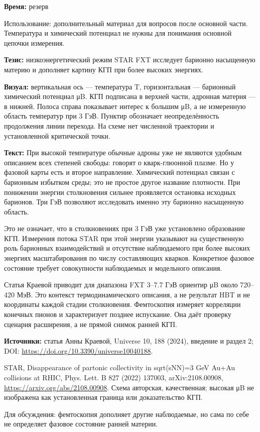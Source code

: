 \textbf{Время:} резерв

Использование: дополнительный материал для вопросов после основной части. Температура и химический потенциал не нужны для понимания основной цепочки измерения.

\textbf{Тезис:} низкоэнергетический режим STAR FXT исследует барионно насыщенную материю и дополняет картину КГП при более высоких энергиях.

\textbf{Визуал:} вертикальная ось — температура T, горизонтальная — барионный химический потенциал μB. КГП подписана в верхней части, адронная материя — в нижней. Полоса справа показывает интерес к большим μB, а не измеренную область температур при 3 ГэВ. Пунктир обозначает неопределённость продолжения линии перехода. На схеме нет численной траектории и установленной критической точки.

\textbf{Текст:} При высокой температуре обычные адроны уже не являются удобным описанием всех степеней свободы: говорят о кварк-глюонной плазме. Но у фазовой карты есть и второе направление. Химический потенциал связан с барионным избытком среды; это не простое другое название плотности. При понижении энергии столкновения сильнее проявляется остановка исходных барионов. Три ГэВ позволяют исследовать именно эту барионно насыщенную область.

Это не означает, что в столкновениях при 3 ГэВ уже установлено образование КГП. Измерения потока STAR при этой энергии указывают на существенную роль барионных взаимодействий и отсутствие наблюдаемого при более высоких энергиях масштабирования по числу составляющих кварков. Конкретное фазовое состояние требует совокупности наблюдаемых и модельного описания.

Статья Краевой приводит для диапазона FXT 3–7.7 ГэВ ориентир μB около 720–420 МэВ. Это контекст термодинамического описания, а не результат HBT и не координаты каждой стадии столкновения. Фемтоскопия измеряет корреляции конечных пионов и характеризует позднее испускание. Она даёт проверку сценария расширения, а не прямой снимок ранней КГП.

\textbf{Источники:} статья Анны Краевой, Universe 10, 188 (2024), введение и раздел 2; DOI: \url{https://doi.org/10.3390/universe10040188}.

STAR, Disappearance of partonic collectivity in sqrt(sNN)=3 GeV Au+Au collisions at RHIC, Phys. Lett. B 827 (2022) 137003, arXiv:2108.00908, \url{https://arxiv.org/abs/2108.00908}. Схема авторская, качественная; высокая μB не изображена как установленная граница или доказательство КГП.

Для обсуждения: фемтоскопия дополняет другие наблюдаемые, но сама по себе не определяет фазовое состояние ранней материи.

